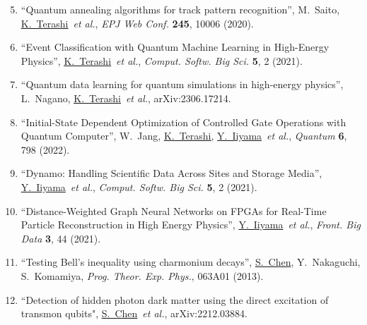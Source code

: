 \documentclass[11pt,a4j,dvipdfmx]{jarticle} 					%
\newcommand{\研究課題名}{誤り耐性量子コンピュータに向けた誤り訂正技術の開発(仮)}
\newcommand{\研究機関名}{東京大学}
\newcommand{\研究代表者氏名}{寺師弘二}
\newcommand{\me}{\underline{\underline{K.~Terashi}}}
\newcommand{\研究期間の最終元号年度}{10}  %
\newcommand{\iiyama}{\underline{Y.~Iiyama}}
\newcommand{\chen}{\underline{S.~Chen}}
\begin{document}
\begin{enumerate}
	\setcounter{enumi}{4}
	\renewcommand{\labelenumi}{[\arabic{enumi}]}
	\item \label{Saito_CHEP} ``Quantum annealing algorithms for track pattern recognition'',
		M.~Saito, \me\ {\it et al.}, {\it EPJ Web Conf.} {\bf 245}, 10006 (2020).\vspace{-3mm}
	\item \label{Terashi_QML_selection} ``Event Classification with Quantum Machine Learning in High-Energy Physics'', 
		\me\ {\it et al.}, {\it Comput. Softw. Big Sci.} {\bf 5}, 2 (2021).\vspace{-3mm}
	\item \label{Terashi_QML_Qdata} ``Quantum data learning for quantum simulations in high-energy physics'', 
	L.~Nagano, \me\ {\it et al.}, arXiv:2306.17214.\vspace{-3mm}
	\item \label{Terashi_AQCEL} ``Initial-State Dependent Optimization of Controlled Gate Operations with Quantum Computer'', 
		W.~Jang, \me, \iiyama\  {\it et al.}, {\it Quantum} {\bf 6}, 798 (2022).\vspace{-3mm}	
	\item \label{Iiyama_Dynamo} ``Dynamo: Handling Scientific Data Across Sites and Storage Media'',
		\iiyama\ {\it et al.},  {\it Comput. Softw. Big Sci.} {\bf 5}, 2 (2021).\vspace{-3mm}
	\item \label{Iiyama_GNN} ``Distance-Weighted Graph Neural Networks on FPGAs for Real-Time Particle Reconstruction in High Energy Physics'',
		\iiyama\ {\it et al.}, {\it Front. Big Data} {\bf 3}, 44 (2021).\vspace{-3mm}
	\item \label{Chen_QM} ``Testing Bell's inequality using charmonium decays'', 
		\chen, Y.~Nakaguchi, S.~Komamiya, {\it Prog. Theor. Exp. Phys.}, 063A01 (2013).\vspace{-3mm}
	\item \label{Chen_DM} ``Detection of hidden photon dark matter using the direct excitation of transmon qubits",
		\chen\ {\it et al.}, arXiv:2212.03884.
\end{enumerate}
\end{document}
